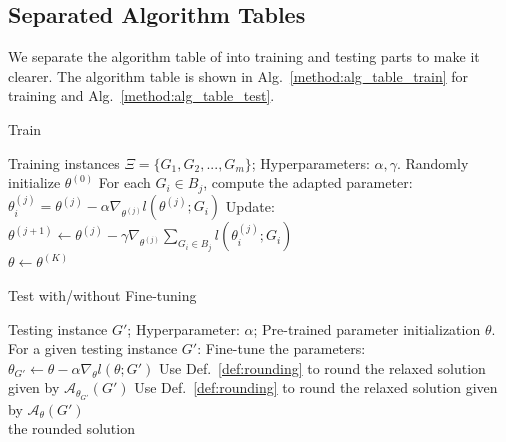 \subsection{Separated Algorithm Tables}
We separate the algorithm table of \proj into training and testing parts to make it clearer. The algorithm table is shown in Alg.~\ref{method:alg_table_train} for training and Alg.~\ref{method:alg_table_test}.

\begin{algorithm}[h]
\caption{Train \proj}
\label{method:alg_table_train}
\begin{algorithmic}[1]
\Require Training instances $\Xi=\{G_1,G_2,...,G_m\}$; Hyperparameters: $\alpha, \gamma$.
\State Randomly initialize $\theta^{(0)}$
 
\State For each $G_i\in B_j$, compute the adapted parameter: $\theta_i^{(j)} = \theta^{(j)} - \alpha \nabla_{\theta^{(j)}}l(\theta^{(j)};G_i)$
\State Update: $\theta^{(j+1)} \gets \theta^{(j)} - \gamma \nabla_{\theta^{(j)}} \sum_{G_i \in B_j} l(\theta_i^{(j)};G_i)$
\EndFor \\
\Return $\theta\leftarrow \theta^{(K)}$
\end{algorithmic}
\end{algorithm}

\begin{algorithm}[h]
\caption{Test \proj with/without Fine-tuning}
\label{method:alg_table_test}
\begin{algorithmic}[1]
\Require Testing instance $G'$; Hyperparameter: $\alpha$; Pre-trained parameter initialization $\theta$.
\State For a given testing instance $G'$: 
\State Fine-tune the parameters: $\theta_{G'} \gets \theta - \alpha \nabla_{\theta} l(\theta; G')$ 
\State Use Def.~\ref{def:rounding} to round the relaxed solution given by $\mathcal{A}_{\theta_{G'}} (G')$ 
\Else
\State Use Def.~\ref{def:rounding} to round the relaxed solution given by $\mathcal{A}_{\theta} (G')$ 
\EndIf \\
\Return the rounded solution 
\end{algorithmic}
\end{algorithm}





